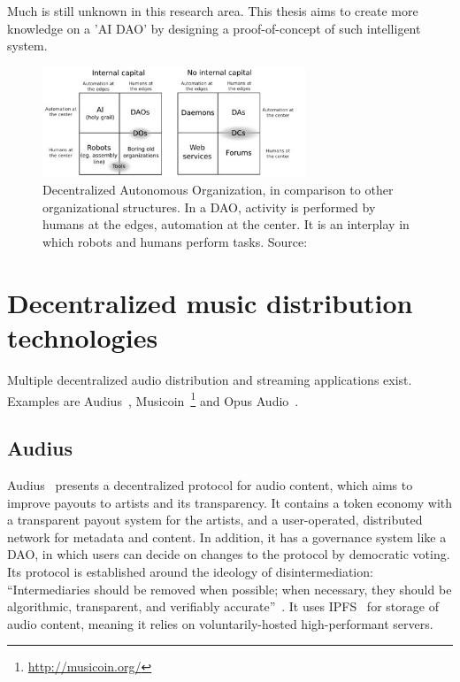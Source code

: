 Much is still unknown in this research area. This thesis aims to create more knowledge on a 'AI DAO' by designing a proof-of-concept of such intelligent system.

\begin{figure}
    \centering
    \includegraphics[width=0.7\textwidth]{introduction/dao-quadrants.jpg}
    \caption{Decentralized Autonomous Organization, in comparison to other organizational structures. In a DAO, activity is performed by humans at the edges, automation at the center. It is an interplay in which robots and humans perform tasks. Source: \cite{buterin2014dao}}
    \label{fig:dao-quadrants}
\end{figure}

\section{Decentralized music distribution technologies}
Multiple decentralized audio distribution and streaming applications exist. Examples are Audius~\citep{audius2018}, Musicoin~\footnote{\url{http://musicoin.org/}} and Opus Audio~\citep{jia2016opus}.

\subsection{Audius}
Audius~\citep{audius2018} presents a decentralized protocol for audio content, which aims to improve payouts to artists and its transparency. It contains a token economy with a transparent payout system for the artists, and a user-operated, distributed network for metadata and content. In addition, it has a governance system like a DAO, in which users can decide on changes to the protocol by democratic voting. Its protocol is established around the ideology of disintermediation: ``Intermediaries  should  be  removed  when  possible; when necessary, they should be algorithmic, transparent, and verifiably accurate''~\citep{audius2018}. It uses IPFS~\citep{benet2014ipfs} for storage of audio content, meaning it relies on voluntarily-hosted high-performant servers.

